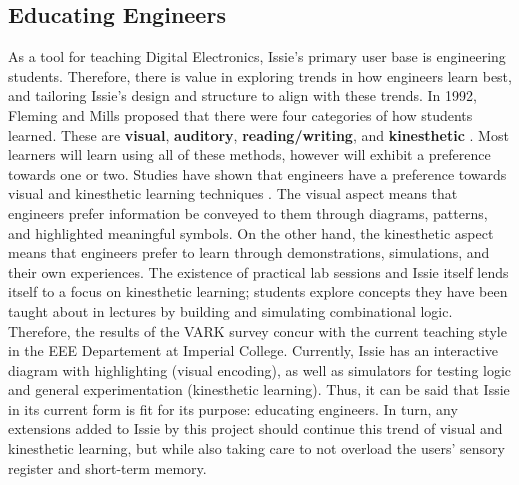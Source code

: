 \subsection{Educating Engineers} \label{subsec:educating_engineers}
As a tool for teaching Digital Electronics, Issie's primary user base is engineering students. Therefore, there is value in exploring trends in how engineers learn best, and tailoring Issie's design and structure to align with these trends.
In 1992, Fleming and Mills proposed that there were four categories of how students learned. These are \textbf{visual}, \textbf{auditory}, \textbf{reading/writing}, and \textbf{kinesthetic} \cite{Fleming1992}. Most learners will learn using all of these methods, however will exhibit a preference towards one or two. Studies have shown that engineers have a preference towards visual and kinesthetic learning techniques \cite{vark_engineers}. The visual aspect means that engineers prefer information be conveyed to them through diagrams, patterns, and highlighted meaningful symbols. On the other hand, the kinesthetic aspect means that engineers prefer to learn through demonstrations, simulations, and their own experiences. The existence of practical lab sessions and Issie itself lends itself to a focus on kinesthetic learning; students explore concepts they have been taught about in lectures by building and simulating combinational logic. Therefore, the results of the VARK survey concur with the current teaching style in the EEE Departement at Imperial College. Currently, Issie has an interactive diagram with highlighting (visual encoding), as well as simulators for testing logic and general experimentation (kinesthetic learning). Thus, it can be said that Issie in its current form is fit for its purpose: educating engineers. In turn, any extensions added to Issie by this project should continue this trend of visual and kinesthetic learning, but while also taking care to not overload the users' sensory register and short-term memory.


